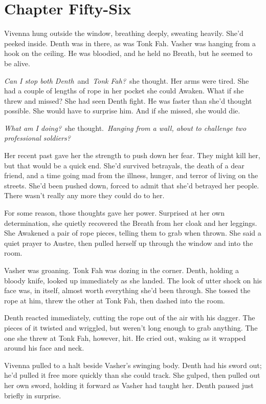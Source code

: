 \section{Chapter Fifty-Six}

Vivenna hung outside the window, breathing deeply, sweating heavily. She’d peeked inside. Denth was in there, as was Tonk Fah. Vasher was hanging from a hook on the ceiling. He was bloodied, and he held no Breath, but he seemed to be alive.

\textit{Can I stop both Denth}~and~\textit{Tonk Fah?}~she thought. Her arms were tired. She had a couple of lengths of rope in her pocket she could Awaken. What if she threw and missed? She had seen Denth fight. He was faster than she’d thought possible. She would have to surprise him. And if she missed, she would die.

\textit{What am I doing?}~she thought.~\textit{Hanging from a wall, about to challenge two professional soldiers?}

Her recent past gave her the strength to push down her fear. They might kill her, but that would be a quick end. She’d survived betrayals, the death of a dear friend, and a time going mad from the illness, hunger, and terror of living on the streets. She’d been pushed down, forced to admit that she’d betrayed her people. There wasn’t really any more they could do to her.

For some reason, those thoughts gave her power. Surprised at her own determination, she quietly recovered the Breath from her cloak and her leggings. She Awakened a pair of rope pieces, telling them to grab when thrown. She said a quiet prayer to Austre, then pulled herself up through the window and into the room.

Vasher was groaning. Tonk Fah was dozing in the corner. Denth, holding a bloody knife, looked up immediately as she landed. The look of utter shock on his face was, in itself, almost worth everything she’d been through. She tossed the rope at him, threw the other at Tonk Fah, then dashed into the room.

Denth reacted immediately, cutting the rope out of the air with his dagger. The pieces of it twisted and wriggled, but weren’t long enough to grab anything. The one she threw at Tonk Fah, however, hit. He cried out, waking as it wrapped around his face and neck.

Vivenna pulled to a halt beside Vasher’s swinging body. Denth had his sword out; he’d pulled it free more quickly than she could track. She gulped, then pulled out her own sword, holding it forward as Vasher had taught her. Denth paused just briefly in surprise.

